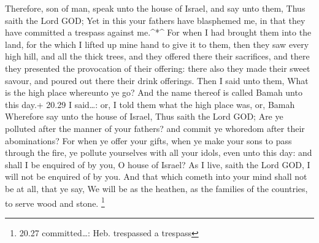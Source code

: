  Therefore, son of man, speak unto the house of Israel, and
say unto them, Thus saith the Lord GOD; Yet in this your fathers have
blasphemed me, in that they have committed a trespass against
me.\^{}*\^{}  For when I had brought them into the land,
for the which I lifted up mine hand to give it to them, then they saw
every high hill, and all the thick trees, and they offered there their
sacrifices, and there they presented the provocation of their offering:
there also they made their sweet savour, and poured out there their
drink offerings.  Then I said unto them, What is the high
place whereunto ye go? And the name thereof is called Bamah unto this
day.+ 20.29 I said\ldots: or, I told them what the high place was, or,
Bamah  Wherefore say unto the house of Israel, Thus saith
the Lord GOD; Are ye polluted after the manner of your fathers? and
commit ye whoredom after their abominations?  For when ye
offer your gifts, when ye make your sons to pass through the fire, ye
pollute yourselves with all your idols, even unto this day: and shall I
be enquired of by you, O house of Israel? As I live, saith the Lord GOD,
I will not be enquired of by you.  And that which cometh
into your mind shall not be at all, that ye say, We will be as the
heathen, as the families of the countries, to serve wood and stone.
\footnote{20.27 committed\ldots: Heb. trespassed a trespass}

